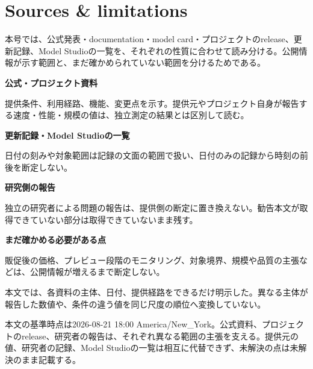\section*{Sources \& limitations}

本号では、公式発表・documentation・model card・プロジェクトのrelease、更新記録、Model Studioの一覧を、それぞれの性質に合わせて読み分ける。公開情報が示す範囲と、まだ確かめられていない範囲を分けるためである。

\begin{tcolorbox}[enhanced,breakable,colback=SurveySoft,colframe=SurveyRule,boxrule=0.4pt,arc=1mm,left=3mm,right=3mm,top=2mm,bottom=2mm]
\textbf{公式・プロジェクト資料}\par
提供条件、利用経路、機能、変更点を示す。提供元やプロジェクト自身が報告する速度・性能・規模の値は、独立測定の結果とは区別して読む。\par\smallskip
\textbf{更新記録・Model Studioの一覧}\par
日付の刻みや対象範囲は記録の文面の範囲で扱い、日付のみの記録から時刻の前後を断定しない。\par\smallskip
\textbf{研究側の報告}\par
独立の研究者による問題の報告は、提供側の断定に置き換えない。勧告本文が取得できていない部分は取得できていないまま残す。\par\smallskip
\textbf{まだ確かめる必要がある点}\par
販促後の価格、プレビュー段階のモニタリング、対象境界、規模や品質の主張などは、公開情報が増えるまで断定しない。
\end{tcolorbox}

本文では、各資料の主体、日付、提供経路をできるだけ明示した。異なる主体が報告した数値や、条件の違う値を同じ尺度の順位へ変換していない。

\nocite{w2026w34w34eventc010,w2026w34w34eventc011,w2026w34w34eventc087,w2026w34w34eventc031,w2026w34w34eventgapawsagentcorememoryjson,w2026w34w34eventc104,w2026w34w34eventc105,w2026w34w34eventc007,w2026w34w34eventc012,w2026w34w34eventc019,w2026w34w34eventc100,w2026w34w34eventc101,w2026w34w34eventc047,w2026w34w34eventrefreshkimicodecliv038v037,w2026w34w34eventc099,w2026w34w34eventc102,w2026w34w34eventrefreshopenaireplitgpt56luna,w2026w34w34eventc096,w2026w34w34eventc052,w2026w34w34eventc066,w2026w34w34eventc004,w2026w34w34eventc055,w2026w34w34eventc006,w2026w34w34eventc005,w2026w34w34eventc008,w2026w34w34eventc002,w2026w34w34eventrefreshopenaidefenderswindow,w2026w34w34eventc017,w2026w34w34eventc045,w2026w34w34eventc039,w2026w34w34eventgapalibabakimik3modelstudio,w2026w34w34eventc040,w2026w34w34eventc023,w2026w34w34eventc030,w2026w34w34eventc091,w2026w34w34eventc018,w2026w34w34eventc020,w2026w34w34eventgapalibabawan30modelstudio,w2026w34w34eventc022,w2026w34w34eventc003,w2026w34w34eventc026}

\begin{claimboundary}
本文の基準時点は2026-08-21 18:00 America/New\_York。公式資料、プロジェクトのrelease、研究者の報告は、それぞれ異なる範囲の主張を支える。提供元の値、研究者の記録、Model Studioの一覧は相互に代替できず、未解決の点は未解決のまま記載する。
\end{claimboundary}
